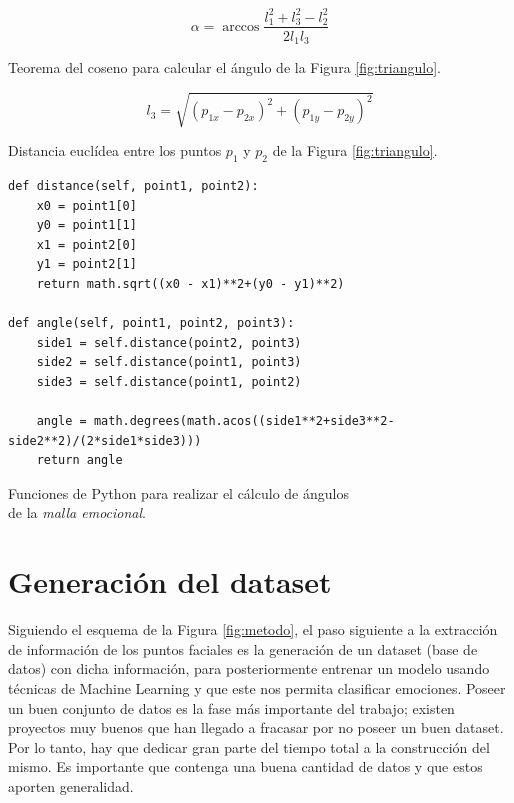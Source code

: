 \begin{myequation}[h]
\begin{equation}
\alpha = \arccos{\frac{l_{1}^{2}+l_{3}^{2}-l_{2}^{2}}{2l_{1}l_{3}}}
\nonumber
\label{ec:teorema_coseno}
\end{equation}
\captionsetup{justification=centering}
\caption[Teorema del coseno para calcular el ángulo de la Figura \ref{fig:triangulo}.]{Teorema del coseno para calcular el ángulo de la Figura \ref{fig:triangulo}.}
\end{myequation} 

\begin{myequation}[h]
\begin{equation}
l_{3} = \sqrt{(p_{1x}-p_{2x})^{2}+(p_{1y}-p_{2y})^{2}}
\nonumber
\label{ec:ecuclidea_puntos}
\end{equation}
\captionsetup{justification=centering}
\caption[Distancia euclídea entre los puntos $p_{1}$ y $p_{2}$ de la Figura \ref{fig:triangulo}.]{Distancia euclídea entre los puntos $p_{1}$ y $p_{2}$ de la Figura \ref{fig:triangulo}.}
\end{myequation} 

\begin{code}[h]
\begin{lstlisting}[style=Python]
def distance(self, point1, point2):
    x0 = point1[0]
    y0 = point1[1]
    x1 = point2[0]
    y1 = point2[1]
    return math.sqrt((x0 - x1)**2+(y0 - y1)**2)

def angle(self, point1, point2, point3):
    side1 = self.distance(point2, point3)
    side2 = self.distance(point1, point3)
    side3 = self.distance(point1, point2)
    
    angle = math.degrees(math.acos((side1**2+side3**2-side2**2)/(2*side1*side3)))
    return angle
\end{lstlisting}
\captionsetup{justification=centering}
\caption[Funciones de Python para realizar el cálculo de ángulos\\
de la \textit{malla emocional}.]{Funciones de Python para realizar el cálculo de ángulos\\
de la \textit{malla emocional}.}
\label{cod:angulos}
\end{code}

\section{Generación del dataset}
\label{sec:generacion_dataset}

Siguiendo el esquema de la Figura \ref{fig:metodo}, el paso siguiente a la extracción de información de los puntos faciales es la generación de un dataset (base de datos) con dicha información, para posteriormente entrenar un modelo usando técnicas de Machine Learning y que este nos permita clasificar emociones. Poseer un buen conjunto de datos es la fase más importante del trabajo; existen proyectos muy buenos que han llegado a fracasar por no poseer un buen dataset. Por lo tanto, hay que dedicar gran parte del tiempo total a la construcción del mismo. Es importante que contenga una buena cantidad de datos y que estos aporten generalidad.\\


